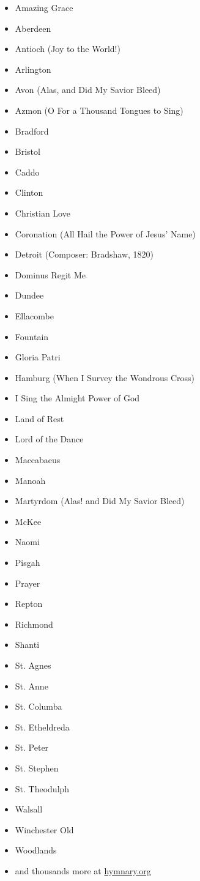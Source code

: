 \begin{multicols}{3}
\begin{itemize}
\sc\item Amazing Grace
  \item Aberdeen
	\item Antioch (\textup{Joy to the World!}) 
	\item Arlington
	\item Avon (Alas, and Did My Savior Bleed)
	\item Azmon (\textup{O For a Thousand Tongues to Sing})
	\item Bradford
	\item Bristol
	\item Caddo
	\item Clinton
	\item Christian Love
	\item Coronation \textup{(All Hail the Power of Jesus' Name)}
	\item Detroit (Composer: Bradshaw, 1820)
	\item Dominus Regit Me
	\item Dundee
	\item Ellacombe
	\item Fountain
	\item Gloria Patri
	\item Hamburg (\textup{When I Survey the Wondrous Cross})
  \item I Sing the Almight Power of God
	\item Land of Rest
	\item Lord of the Dance
	\item Maccabaeus
	\item Manoah
	\item Martyrdom (\textup{Alas! and Did My Savior Bleed})
	\item McKee
	\item Naomi
	\item Pisgah
	\item Prayer
	\item Repton
	\item Richmond
	\item Shanti
	\item St. Agnes
	\item St. Anne
	\item St. Columba
	\item St. Etheldreda
	\item St. Peter
	\item St. Stephen
	\item St. Theodulph
	\item Walsall
	\item Winchester Old
	\item Woodlands
	\item \textup{and thousands more at \href{https://hymnary.org/search?page=3&qu=meter\%3A8.6.8.6\%20in\%3Atunes&sort=totalInstances}{hymnary.org}}
\end{itemize}
\end{multicols}

